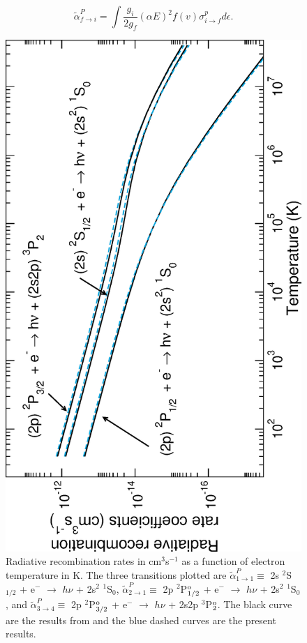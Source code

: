 \begin{equation}\label{eq:spe_formalrate}
\tilde{\alpha}^P_{f\rightarrow i} = \int\frac{g_i}{2g_f}(\alpha E)^2f(v)\sigma^p_{i\rightarrow f}d\epsilon.
\end{equation}
%
\begin{figure}
\includegraphics[scale=0.54,angle=-90]{Figures/Spectral/rates/be-like/total.eps}
\caption{Radiative recombination rates in cm$^3$s$^{-1}$ as a function of electron temperature in K. The three transitions plotted are $\tilde{\alpha}^P_{1\rightarrow 1} \equiv$ 2s $^2$S$_{1/2}$ + e$^-$ $\rightarrow$ $h\nu$ + 2s$^2$ $^1$S$_0$, $\tilde{\alpha}^P_{2\rightarrow 1} \equiv$ 2p $^2$P$_{1/2}^{\rm o}$ + e$^-$ $\rightarrow$ $h\nu$ + 2s$^2$ $^1$S$_0$, and $\tilde{\alpha}^P_{3\rightarrow 4} \equiv$ 2p $^2$P$_{3/2}^{\rm o}$ + e$^-$ $\rightarrow$ $h\nu$ + 2s2p $^3$P$_2^{\rm o}$. The black curve are the results from \citet{2006ApJS..167..334B} and the blue dashed curves are the present results.\label{fig:spe_boron}}
\end{figure}
